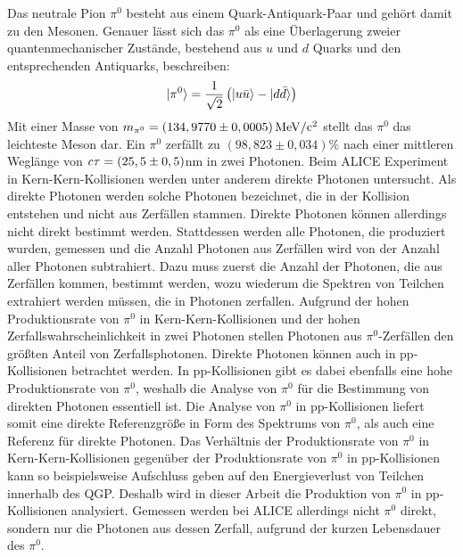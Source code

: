Das neutrale Pion $\pi^{0}$ besteht aus einem Quark-Antiquark-Paar und gehört damit zu den Mesonen.
Genauer lässt sich das $\pi^{0}$ als eine Überlagerung zweier quantenmechanischer Zustände, bestehend aus $u$ und $d$ Quarks und den entsprechenden Antiquarks, beschreiben:
\begin{align}
\lvert\pi^{0}\rangle = \frac{1}{\sqrt{2}}\left(\lvert u\bar{u}\rangle-\lvert d\bar{d}\rangle\right) \label{eq:pi0state}
\end{align}
Mit einer Masse von $m_{\pi^{0}} = \left(134,9770\pm0,0005\right) \rm{MeV}/c^{2}$ \cite{book:pdg} stellt das $\pi^{0}$ das leichteste Meson dar.
Ein ${\pi^{0}}$ zerf{ä}llt zu $\left( 98,823\pm0,034\right)\%$ nach einer mittleren Weglänge von ${\it c\tau} = (25,5\pm0,5)$nm \cite{book:pdg} in zwei Photonen.
\newline
Beim ALICE Experiment in Kern-Kern-Kollisionen werden unter anderem direkte Photonen untersucht.
Als direkte Photonen werden solche Photonen bezeichnet, die in der Kollision entstehen und nicht aus Zerfällen stammen.
Direkte Photonen können allerdings nicht direkt bestimmt werden.
Stattdessen werden alle Photonen, die produziert wurden, gemessen und die Anzahl Photonen aus Zerfällen wird von der Anzahl aller Photonen subtrahiert.
Dazu muss zuerst die Anzahl der Photonen, die aus Zerfällen kommen, bestimmt werden, wozu wiederum die Spektren von Teilchen extrahiert werden müssen, die in Photonen zerfallen.
Aufgrund der hohen Produktionsrate von $\pi^{0}$ in Kern-Kern-Kollisionen und der hohen Zerfallswahrscheinlichkeit in zwei Photonen stellen Photonen aus $\pi^{0}$-Zerfällen den größten Anteil von Zerfallsphotonen.
\newline
Direkte Photonen können auch in pp-Kollisionen betrachtet werden.
In pp-Kollisionen gibt es dabei ebenfalls eine hohe Produktionsrate von $\pi^{0}$, weshalb die Analyse von $\pi^{0}$ für die Bestimmung von direkten Photonen essentiell ist.
Die Analyse von $\pi^{0}$ in pp-Kollisionen liefert somit eine direkte Referenzgröße in Form des Spektrums von $\pi^{0}$, als auch eine Referenz für direkte Photonen.
Das Verhältnis der Produktionsrate von $\pi^{0}$ in Kern-Kern-Kollisionen gegenüber der Produktionsrate von $\pi^{0}$ in pp-Kollisionen kann so beispielsweise Aufschluss geben auf den Energieverlust von Teilchen innerhalb des QGP.
Deshalb wird in dieser Arbeit die Produktion von $\pi^{0}$ in pp-Kollisionen analysiert.
\newline
Gemessen werden bei ALICE allerdings nicht $\pi^{0}$ direkt, sondern nur die Photonen aus dessen Zerfall, aufgrund der kurzen Lebensdauer des $\pi^{0}$.
